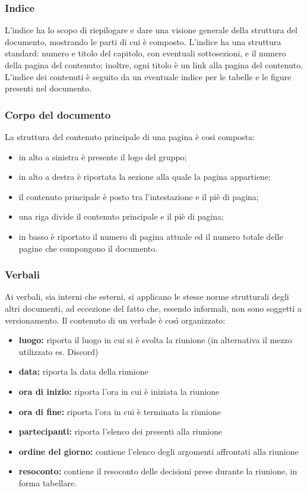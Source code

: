 \subsubsection{Indice}
L'indice ha lo scopo di riepilogare e dare una visione generale della struttura del documento, mostrando le parti di cui è composto. L'indice ha una struttura standard: numero e titolo del capitolo, con eventuali sottosezioni, e il numero della pagina del contenuto; inoltre, ogni titolo è un link alla pagina del contenuto. L'indice dei contenuti è seguito da un eventuale indice per le tabelle e le figure presenti nel documento.
\subsubsection{Corpo del documento}
La struttura del contenuto principale di una pagina è cosi composta:
\begin{itemize}
\item in alto a sinistra è presente il logo del gruppo;
	\item in alto a destra è riportata la sezione alla quale la pagina appartiene;
		\item il contenuto principale è posto tra l'intestazione e il piè di pagina;
			\item una riga divide il contenuto principale e il piè di pagina;
				\item in basso è riportato il numero di pagina attuale ed il numero totale delle pagine che compongono il documento.
\end{itemize}
\subsubsection{Verbali}
Ai verbali, sia interni che esterni, si applicano le stesse norme strutturali degli altri documenti, ad eccezione del fatto che, essendo informali, non sono soggetti a versionamento. Il contenuto di un verbale è così organizzato:
\begin{itemize}
\item \textbf{luogo:} riporta il luogo in cui si è svolta la riunione (in alternativa il mezzo utilizzato es. Discord)
	\item \textbf{data:} riporta la data della riunione
		\item \textbf{ora di inizio:} riporta l'ora in cui è iniziata la riunione
			\item \textbf{ora di fine:} riporta l'ora in cui è terminata la riunione
				\item \textbf{partecipanti:} riporta l'elenco dei presenti alla riunione
					\item \textbf{ordine del giorno:} contiene l'elenco degli argomenti affrontati alla riunione
						\item \textbf{resoconto:}  contiene il resoconto delle decisioni prese durante la riunione, in forma tabellare.	
\end{itemize}
